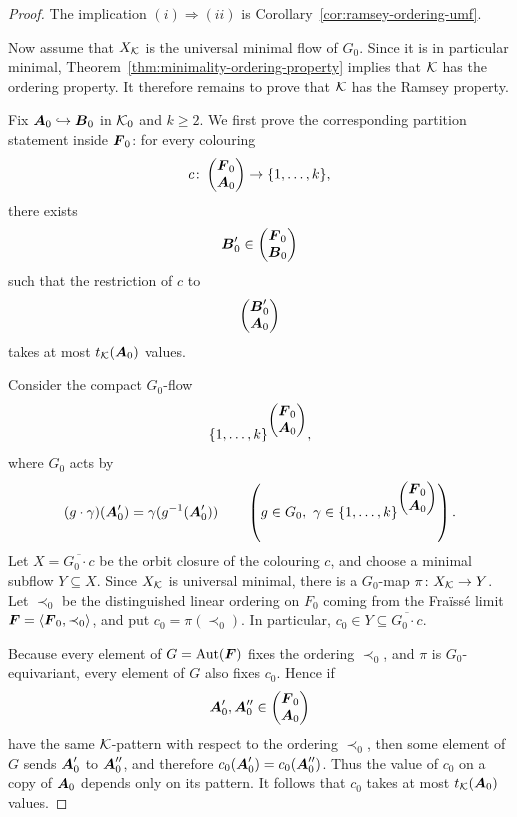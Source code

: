 \begin{proof}
    The implication \((i)\Rightarrow(ii)\) is
    Corollary~\ref{cor:ramsey-ordering-umf}.

    Now assume that \(X_{\mathcal{K}}\) is the universal minimal flow of \(G_0\). Since it is
    in particular minimal, Theorem~\ref{thm:minimality-ordering-property}
    implies that \(\mathcal{K}\) has the ordering property. It therefore remains to prove
    that \(\mathcal{K}\) has the Ramsey property.

    Fix \(\boldsymbol{A}_0\hookrightarrow\boldsymbol{B}_0\) in \(\mathcal{K}_0\) and \(k\geq 2\). We first
    prove the corresponding partition statement inside \(\boldsymbol{F}_0\): for every
    colouring
    \[
        c\colon\begin{pmatrix}\boldsymbol{F}_0\\ \boldsymbol{A}_0\end{pmatrix}\to\{1,\dots,k\},
    \]
    there exists
    \[
        \boldsymbol{B}_0'\in\begin{pmatrix}\boldsymbol{F}_0\\ \boldsymbol{B}_0\end{pmatrix}
    \]
    such that the restriction of \(c\) to
    \[
        \begin{pmatrix}\boldsymbol{B}_0'\\ \boldsymbol{A}_0\end{pmatrix}
    \]
    takes at most \(t_{\mathcal{K}}(\boldsymbol{A}_0)\) values.

    Consider the compact \(G_0\)-flow
    \[
        \{1,\dots,k\}^{\begin{pmatrix}\boldsymbol{F}_0\\ \boldsymbol{A}_0\end{pmatrix}},
    \]
    where \(G_0\) acts by
    \[
        (g\cdot \gamma)(\boldsymbol{A}_0')=\gamma(g^{-1}(\boldsymbol{A}_0'))
        \qquad
        \left(g\in G_0,\ \gamma\in \{1,\dots,k\}^{\begin{pmatrix}\boldsymbol{F}_0\\ \boldsymbol{A}_0\end{pmatrix}}\right).
    \]
    Let \(X=\overline{G_0\cdot c}\) be the orbit closure of the colouring \(c\),
    and choose a minimal subflow \(Y\subseteq X\). Since \(X_{\mathcal{K}}\) is universal
    minimal, there is a \(G_0\)-map \(\pi\colon X_{\mathcal{K}}\to Y\). Let \(\prec_0\)
    be the distinguished linear ordering on \(F_0\) coming from the Fraïssé
    limit \(\boldsymbol{F}=\langle\boldsymbol{F}_0,\prec_0\rangle\), and put
    \(c_0=\pi(\prec_0)\). In particular,
    \(c_0\in Y\subseteq\overline{G_0\cdot c}\).

    Because every element of \(G=\operatorname{Aut}(\boldsymbol{F})\) fixes the ordering \(\prec_0\), and \(\pi\) is \(G_0\)-equivariant, every element of \(G\) also fixes \(c_0\). Hence if
    \[
        \boldsymbol{A}_0',\boldsymbol{A}_0''\in\begin{pmatrix}\boldsymbol{F}_0\\ \boldsymbol{A}_0\end{pmatrix}
    \]
    have the same \(\mathcal{K}\)-pattern with respect to the ordering \(\prec_0\), then some element of \(G\) sends \(\boldsymbol{A}_0'\) to \(\boldsymbol{A}_0''\), and therefore \(c_0(\boldsymbol{A}_0')=c_0(\boldsymbol{A}_0'')\). Thus the value of \(c_0\) on a copy of \(\boldsymbol{A}_0\) depends only on its pattern. It follows that \(c_0\) takes at most \(t_{\mathcal{K}}(\boldsymbol{A}_0)\) values.


\end{proof}
